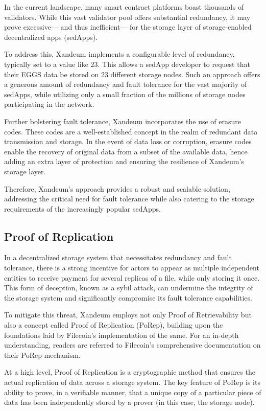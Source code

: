 \documentclass[11 pt]{article}   	%
\begin{document}
In the current landscape, many smart contract platforms boast thousands of validators. While this vast validator pool offers substantial redundancy, it may prove excessive— and thus inefficient— for the storage layer of storage-enabled decentralized apps (sedApps).

To address this, Xandeum implements a configurable level of redundancy, typically set to a value like 23. This allows a sedApp developer to request that their EGGS data be stored on 23 different storage nodes. Such an approach offers a generous amount of redundancy and fault tolerance for the vast majority of sedApps, while utilizing only a small fraction of the millions of storage nodes participating in the network.

Further bolstering fault tolerance, Xandeum incorporates the use of erasure codes. These codes are a well-established concept in the realm of redundant data transmission and storage. In the event of data loss or corruption, erasure codes enable the recovery of original data from a subset of the available data, hence adding an extra layer of protection and ensuring the resilience of Xandeum's storage layer.

Therefore, Xandeum's approach provides a robust and scalable solution, addressing the critical need for fault tolerance while also catering to the storage requirements of the increasingly popular sedApps.

\subsection{Proof of Replication}
In a decentralized storage system that necessitates redundancy and fault tolerance, there is a strong incentive for actors to appear as multiple independent entities to receive payment for several replicas of a file, while only storing it once. This form of deception, known as a sybil attack, can undermine the integrity of the storage system and significantly compromise its fault tolerance capabilities.

To mitigate this threat, Xandeum employs not only Proof of Retrievability \cite{shachamwaters08} but also a concept called Proof of Replication (PoRep), building upon the foundations laid by Filecoin's \cite{filecoin17} implementation of the same. For an in-depth understanding, readers are referred to Filecoin's comprehensive documentation on their PoRep mechanism.

At a high level, Proof of Replication is a cryptographic method that ensures the actual replication of data across a storage system. The key feature of PoRep is its ability to prove, in a verifiable manner, that a unique copy of a particular piece of data has been independently stored by a prover (in this case, the storage node).
\end{document}

